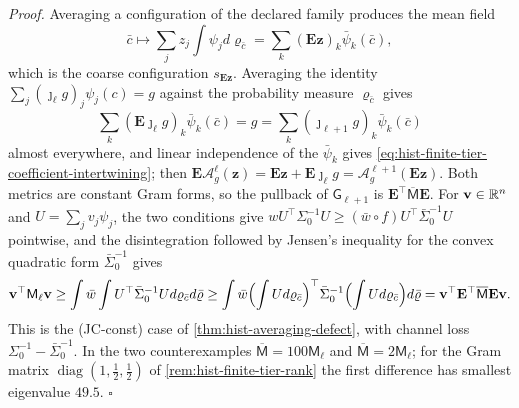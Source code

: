 \noindent\emph{Proof.}
Averaging a configuration of the declared family produces the mean field
\[
\bar c\longmapsto\sum_jz_j\int\psi_jd\varrho_{\bar c}
=\sum_k(\mathbf E\mathbf z)_k\bar\psi_k(\bar c),
\]
which is the coarse configuration \(s_{\mathbf E\mathbf z}\). Averaging the
identity \(\sum_j(\jmath_\ell g)_j\psi_j(c)=g\) against the probability measure
\(\varrho_{\bar c}\) gives
\[
\sum_k(\mathbf E\jmath_\ell g)_k\bar\psi_k(\bar c)=g=\sum_k(\jmath_{\ell+1}g)_k\bar\psi_k(\bar c)
\]
almost everywhere, and linear independence of the \(\bar\psi_k\) gives
\eqref{eq:hist-finite-tier-coefficient-intertwining}; then
\(\mathbf E\mathscr A^\ell_g(\mathbf z)=\mathbf E\mathbf z+\mathbf E\jmath_\ell g
=\mathscr A^{\ell+1}_g(\mathbf E\mathbf z)\). Both metrics are constant Gram
forms, so the pullback of \(\mathsf G_{\ell+1}\) is
\(\mathbf E^\top\overline{\mathsf M}\mathbf E\). For \(\mathbf v\in\mathbb R^n\) and
\(U=\sum_jv_j\psi_j\), the two conditions give
\(wU^\top\Sigma_0^{-1}U\geq(\bar w\circ f)U^\top\bar\Sigma_0^{-1}U\) pointwise,
and the disintegration followed by Jensen's inequality for the convex quadratic
form \(\bar\Sigma_0^{-1}\) gives
\[
\mathbf v^\top\mathsf M_\ell\mathbf v
\geq\int\bar w\int U^\top\bar\Sigma_0^{-1}Ud\varrho_{\bar c}d\bar\varrho
\geq\int\bar w
\Bigl(\int Ud\varrho_{\bar c}\Bigr)^\top\bar\Sigma_0^{-1}
\Bigl(\int Ud\varrho_{\bar c}\Bigr)d\bar\varrho
=\mathbf v^\top\mathbf E^\top\overline{\mathsf M}\mathbf E\mathbf v.
\]
This is the (JC-const) case of \cref{thm:hist-averaging-defect}, with channel loss
\(\Sigma_0^{-1}-\bar\Sigma_0^{-1}\). In the two counterexamples
\(\overline{\mathsf M}=100\mathsf M_\ell\) and \(\overline{\mathsf M}=2\mathsf M_\ell\);
for the Gram matrix \(\operatorname{diag}(1,\tfrac12,\tfrac12)\) of
\cref{rem:hist-finite-tier-rank} the first difference has smallest eigenvalue
\(49.5\). \(\square\)

